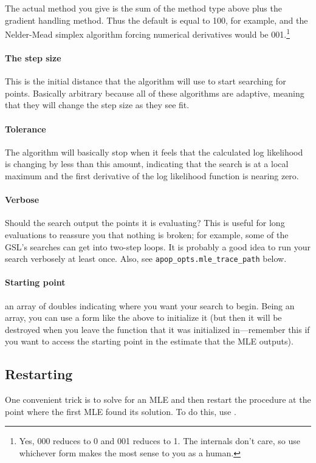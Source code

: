 The actual method you give is the sum of the method type above plus the
gradient handling method. Thus the default is equal to 100, for example, and the
Nelder-Mead simplex algorithm forcing numerical derivatives would be
001.\footnote{Yes, 000 reduces to 0 and 001 reduces to 1. The internals
don't care, so use whichever form makes the most sense to you as a human.}


\paragraph{The step size} This is the initial distance that the
algorithm will use to start searching for points. Basically arbitrary
because all of these algorithms are adaptive, meaning that they will
change the step size as they see fit.

\paragraph{Tolerance} The algorithm will basically stop when it feels
that the calculated log likelihood is changing by less than this amount,
indicating that the search is at a local maximum and the first derivative of
the log likelihood function is nearing zero.

\paragraph{Verbose} Should the search output the points it is evaluating?
This is useful for long evaluations to reassure you that nothing is
broken; for example, some of the GSL's searches can get into two-step loops.
It is probably a good idea to run your search verbosely at least once.
Also, see {\tt apop\_opts.mle\_trace\_path} below.

\paragraph{Starting point} an array of doubles indicating where you want
your search to begin. Being an array, you can use a form like the above
to initialize it (but then it will be destroyed when you leave the
function that it was initialized in---remember this if you want to
access the starting point in the estimate that the MLE outputs).


\subsection{Restarting} One convenient trick is to solve for an MLE and
then restart the procedure at the point where the first MLE found its solution.
To do this, use .

